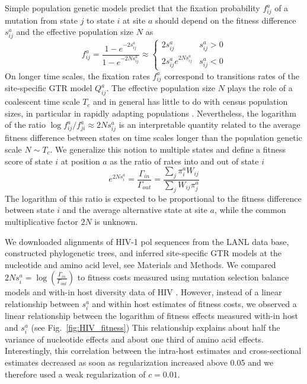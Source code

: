 \documentclass[aps,rmp,twocolumn,linenumbers]{revtex4-1}
\newcommand{\pc}{c}
\begin{document}
Simple population genetic models predict that the fixation probability $f_{ij}^a$ of a mutation from state $j$ to state $i$ at site $a$ should depend on the fitness difference $s^a_{ij}$ and the effective population size $N$ as \citep{kimura_diffusion_1964}
\begin{equation}
	f^a_{ij} = \frac{1-e^{-2s^a_{ij}}}{1-e^{-2Ns^a_{ij}}} \approx
	\begin{cases}
		2s^a_{ij} & s^a_{ij}>0 \\
		2s^a_{ij} e^{2Ns^a_{ij}} & s^a_{ij} < 0
	\end{cases}
\end{equation}
On longer time scales, the fixation rates $f^a_{ij}$ correspond to transitions rates of the site-specific GTR model $Q^a_{ij}$.
The effective population size $N$ plays the role of a coalescent time scale $T_c$ and in general has little to do with census population sizes, in particular in rapidly adapting populations \citep{neher_genetic_2013}.
Nevertheless, the logarithm of the ratio $\log f^a_{ij}/f^a_{ji} \approx 2Ns^a_{ij}$ is an interpretable quantity related to the average fitness difference between states on time scales longer than the population genetic scale $N\sim T_c$.
We generalize this notion to multiple states and define a fitness score of state $i$ at position $a$ as the ratio of rates into and out of state $i$
\begin{equation}
	e^{2N s_i^a} = \frac{\Gamma_{in}}{\Gamma_{out}} = \frac{\sum_j \pi_i^a W_{ij}}{\sum_j W_{ij}\pi_j^a}
\end{equation}
The logarithm of this ratio is expected to be proportional to the fitness difference between state $i$ and the average alternative state at site $a$, while the common multiplicative factor $2N$ is unknown.


We downloaded alignments of HIV-1 pol sequences from the LANL data base, constructed phylogenetic trees, and inferred site-specific GTR models at the nucleotide and amino acid level, see Materials and Methods.
We compared $2N s_i^a = \log\left(\frac{\Gamma_{in}}{\Gamma_{out}}\right)$ to fitness costs measured using mutation selection balance models and with-in host diversity data of HIV \citep{zanini2017vivo}.
However, instead of a linear relationship between $s_i^a$ and within host estimates of fitness costs, we observed a linear relationship between the logarithm of fitness effects measured with-in host and $s_i^a$ (see Fig.~\ref{fig:HIV_fitness})
This relationship explains about half the variance of nucleotide effects and about one third of amino acid effects.
Interestingly, this correlation between the intra-host estimates and cross-sectional estimates decreased as soon as regularization increased above 0.05 and we therefore used a weak regularization of $\pc=0.01$.
\end{document}
